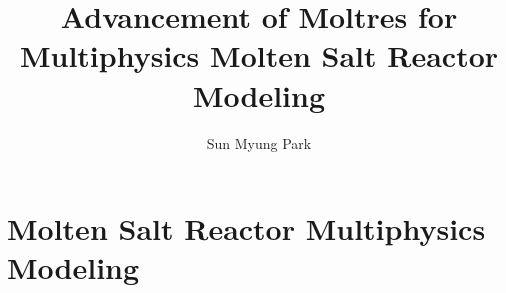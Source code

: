 \documentclass[edeposit,fullpage,11pt]{uiucthesis2021}
\title{Advancement of Moltres for Multiphysics Molten Salt Reactor Modeling}
\author{Sun Myung Park}
\begin{document}
\maketitle

\frontmatter
\begin{abstract}

%

\end{abstract}

\begin{dedication}

\end{dedication}

\begin{acknowledgments}

%

\end{acknowledgments}


{
  \hypersetup{linkcolor=black}
  \tableofcontents
}

\printglossary[title=List of Abbreviations,type=\acronymtype,nonumberlist,
nogroupskip=true]

\pagebreak
\mainmatter
\glsresetall

%

\chapter{Molten Salt Reactor Multiphysics Modeling}
\label{chap:lit}

\glsresetall
\end{document}
